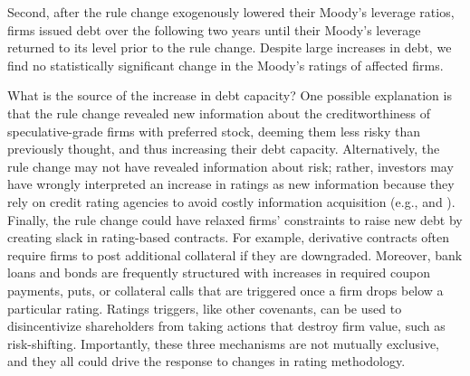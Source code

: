 \documentclass[a4paper, 12pt]{article}
\begin{document}
Second, after the rule change exogenously lowered their Moody's leverage ratios, firms issued debt over the following two years until their Moody's leverage returned to its level prior to the rule change. Despite large increases in debt, we find no statistically significant change in the Moody's ratings of affected firms.


What is the source of the increase in debt capacity? One possible explanation is that the rule change revealed new information about the creditworthiness of speculative-grade firms with preferred stock, deeming them less risky than previously thought, and thus increasing their debt capacity. Alternatively, the rule change may not have revealed information about risk; rather, investors may have wrongly interpreted an increase in ratings as new information because they rely on credit rating agencies to avoid costly information acquisition (e.g., \cite{ramakrishnan1984information} and \cite{millon1985moral}). Finally, the rule change could have relaxed firms' constraints to raise new debt by creating slack in rating-based contracts. For example, derivative contracts often require firms to post additional collateral if they are downgraded. Moreover, bank loans and bonds are frequently structured with increases in required coupon payments, puts, or collateral calls that are triggered once a firm drops below a particular rating. Ratings triggers, like other covenants, can be used to disincentivize shareholders from taking actions that destroy firm value, such as risk-shifting. Importantly, these three mechanisms are not mutually exclusive, and they all could drive the response to changes in rating methodology.
\end{document}
